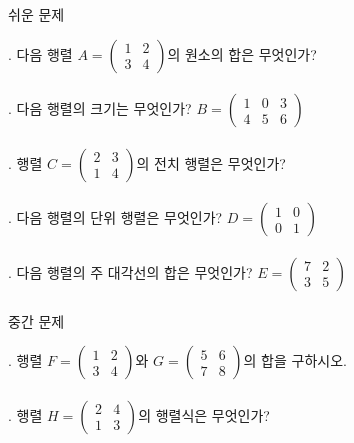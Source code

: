 \documentclass[fleqn]{article}
\begin{document}
      
         쉬운 문제

. 다음 행렬 \( A = \begin{pmatrix} 1 & 2 \\ 3 & 4 \end{pmatrix} \)의 원소의 합은 무엇인가? \\\\

. 다음 행렬의 크기는 무엇인가? \( B = \begin{pmatrix} 1 & 0 & 3 \\ 4 & 5 & 6 \end{pmatrix} \) \\\\

. 행렬 \( C = \begin{pmatrix} 2 & 3 \\ 1 & 4 \end{pmatrix} \)의 전치 행렬은 무엇인가? \\\\

. 다음 행렬의 단위 행렬은 무엇인가? \( D = \begin{pmatrix} 1 & 0 \\ 0 & 1 \end{pmatrix} \) \\\\

. 다음 행렬의 주 대각선의 합은 무엇인가? \( E = \begin{pmatrix} 7 & 2 \\ 3 & 5 \end{pmatrix} \) \\\\

 중간 문제

. 행렬 \( F = \begin{pmatrix} 1 & 2 \\ 3 & 4 \end{pmatrix} \)와 \( G = \begin{pmatrix} 5 & 6 \\ 7 & 8 \end{pmatrix} \)의 합을 구하시오. \\\\

. 행렬 \( H = \begin{pmatrix} 2 & 4 \\ 1 & 3 \end{pmatrix} \)의 행렬식은 무엇인가? \\\\
\end{document}
